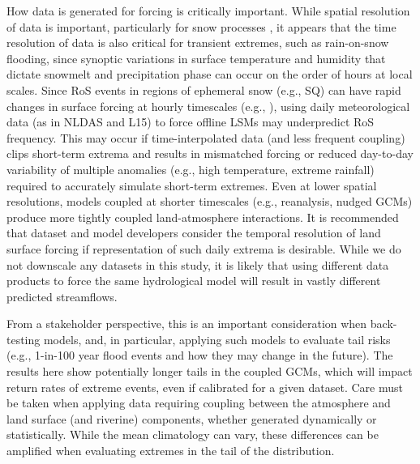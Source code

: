\documentclass[draft]{agujournal2019}
\begin{document}
How data is generated for forcing is critically important. While spatial resolution of data is important, particularly for snow processes \citep{henn2018an}, it appears that the time resolution of data is also critical for transient extremes, such as rain-on-snow flooding, since synoptic variations in surface temperature and humidity that dictate snowmelt and precipitation phase can occur on the order of hours at local scales. Since RoS events in regions of ephemeral snow (e.g., SQ) can have rapid changes in surface forcing at hourly timescales (e.g., \citet{leathers1998severe}), using daily meteorological data (as in NLDAS and L15) to force offline LSMs may underpredict RoS frequency. This may occur if time-interpolated data (and less frequent coupling) clips short-term extrema and results in mismatched forcing or reduced day-to-day variability of multiple anomalies (e.g., high temperature, extreme rainfall) required to accurately simulate short-term extremes. Even at lower spatial resolutions, models coupled at shorter timescales (e.g., reanalysis, nudged GCMs) produce more tightly coupled land-atmosphere interactions. It is recommended that dataset and model developers consider the temporal resolution of land surface forcing if representation of such daily extrema is desirable. While we do not downscale any datasets in this study, it is likely that using different data products to force the same hydrological model will result in vastly different predicted streamflows. 

From a stakeholder perspective, this is an important consideration when back-testing models, and, in particular, applying such models to evaluate tail risks (e.g., 1-in-100 year flood events and how they may change in the future). The results here show potentially longer tails in the coupled GCMs, which will impact return rates of extreme events, even if calibrated for a given dataset. Care must be taken when applying data requiring coupling between the atmosphere and land surface (and riverine) components, whether generated dynamically or statistically. While the mean climatology can vary, these differences can be amplified when evaluating extremes in the tail of the distribution.




\end{document}
